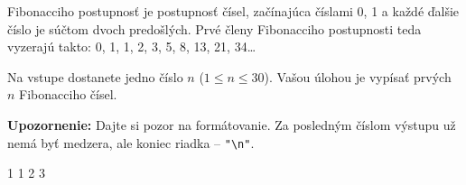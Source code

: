 




Fibonacciho postupnosť je postupnosť čísel, začínajúca číslami 0, 1 a každé ďalšie číslo je súčtom
dvoch predošlých.  Prvé členy Fibonacciho postupnosti teda vyzerajú takto: 0, 1, 1, 2, 3, 5, 8, 13,
21, 34\dots

Na vstupe dostanete jedno číslo $n$ ($1\leq n\leq 30$). Vašou úlohou je vypísať prvých $n$ Fibonacciho čísel.

\textbf{Upozornenie:} Dajte si pozor na formátovanie. Za posledným číslom výstupu už nemá byť
medzera, ale koniec riadka -- \verb!"\n"!.

 1 1 2 3 
\koniec


